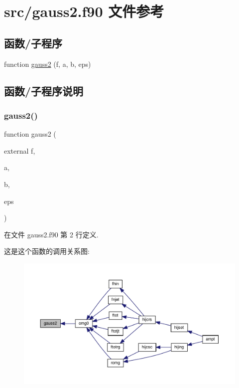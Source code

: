 \hypertarget{gauss2_8f90}{}\section{src/gauss2.f90 文件参考}
\label{gauss2_8f90}
\subsection*{函数/子程序}
\begin{DoxyCompactItemize}
\item 
function \mbox{\hyperlink{gauss2_8f90_a5ce3a45fa6824e0046acc7673d3360da}{gauss2}} (f, a, b, eps)
\end{DoxyCompactItemize}


\subsection{函数/子程序说明}
\mbox{\label{gauss2_8f90_a5ce3a45fa6824e0046acc7673d3360da}} 
\subsubsection{\texorpdfstring{gauss2()}{gauss2()}}
{\footnotesize\ttfamily function gauss2 (\begin{DoxyParamCaption}\item[{external}]{f,  }\item[{}]{a,  }\item[{}]{b,  }\item[{}]{eps }\end{DoxyParamCaption})}



在文件 gauss2.\+f90 第 2 行定义.

这是这个函数的调用关系图\+:
\nopagebreak
\begin{figure}[H]
\begin{center}
\leavevmode
\includegraphics[width=350pt]{gauss2_8f90_a5ce3a45fa6824e0046acc7673d3360da_icgraph}
\end{center}
\end{figure}
